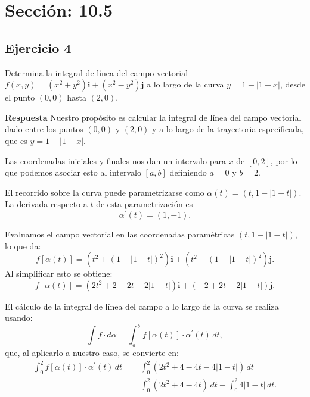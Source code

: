 \documentclass{report}
\begin{document}


\section*{\textcolor{color105}{Sección: 10.5}}
\subsection*{Ejercicio 4}
Determina la integral de línea del campo vectorial \(f(x, y) = \left(x^{2}+y^{2}\right) \mathbf{i} + \left(x^{2}-y^{2}\right) \mathbf{j}\) a lo largo de la curva \(y = 1 - |1 - x|\), desde el punto \((0,0)\) hasta \((2,0)\).

\textbf{Respuesta}
Nuestro propósito es calcular la integral de línea del campo vectorial dado entre los puntos \((0,0)\) y \((2,0)\) y a lo largo de la trayectoria especificada, que es \(y = 1 - |1 - x|\).

Las coordenadas iniciales y finales nos dan un intervalo para \(x\) de \([0,2]\), por lo que podemos asociar esto al intervalo \([a, b]\) definiendo \(a = 0\) y \(b = 2\).

El recorrido sobre la curva puede parametrizarse como \(\alpha(t) = (t, 1 - |1 - t|)\). La derivada respecto a \(t\) de esta parametrización es
\[
\alpha^{\prime}(t) = (1, -1).
\]

Evaluamos el campo vectorial en las coordenadas paramétricas \((t, 1 - |1 - t|)\), lo que da:
\[
f[\alpha(t)] = \left(t^{2} + (1 - |1 - t|)^{2}\right) \mathbf{i} + \left(t^{2} - (1 - |1 - t|)^{2}\right) \mathbf{j}.
\]
Al simplificar esto se obtiene:
\[
f[\alpha(t)] = \left(2 t^{2} + 2 - 2 t - 2|1 - t|\right) \mathbf{i} + \left(-2 + 2 t + 2|1 - t|\right) \mathbf{j}.
\]

El cálculo de la integral de línea del campo a lo largo de la curva se realiza usando:
\[
\int f \cdot d \alpha = \int_{a}^{b} f[\alpha(t)] \cdot \alpha^{\prime}(t) \, dt,
\]
que, al aplicarlo a nuestro caso, se convierte en:
\[
\begin{aligned}
\int_{0}^{2} f[\alpha(t)] \cdot \alpha^{\prime}(t) \, dt & = \int_{0}^{2} \left(2 t^{2} + 4 - 4 t - 4|1 - t|\right) \, dt \\
& = \int_{0}^{2} \left(2 t^{2} + 4 - 4 t\right) \, dt - \int_{0}^{2} 4|1 - t| \, dt.
\end{aligned}
\]
\end{document}
